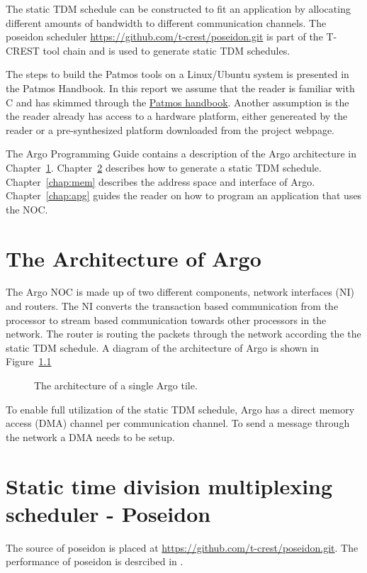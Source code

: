 \documentclass[a4paper,fontsize=10pt,twoside,DIV15,BCOR12mm,headinclude=true,footinclude=false,pagesize,bibtotoc]{scrbook}
\begin{document}
The static TDM schedule can be constructed to fit an application by allocating
different amounts of bandwidth to different communication channels.
The poseidon scheduler \url{https://github.com/t-crest/poseidon.git} is part of
the T-CREST tool chain and is used to generate static TDM schedules.

The steps to build the Patmos tools on a Linux/Ubuntu
system is presented in the Patmos Handbook.
In this report we assume that the reader is familiar with C and has skimmed
through the \href{http://patmos.compute.dtu.dk/patmos_handbook.pdf}{Patmos handbook}.
Another assumption is the the reader already has access to a hardware platform,
either genereated by the reader or a pre-synthesized platform downloaded from the project webpage.

The Argo Programming Guide contains a description of the Argo architecture in Chapter~\ref{chap:arch}.
Chapter~\ref{chap:poseidon} describes how to generate a static TDM schedule.
Chapter~\ref{chap:mem} describes the address space and interface of Argo.
Chapter~\ref{chap:apg} guides the reader on how to program an application that uses the NOC.



\chapter{The Architecture of Argo}
\label{chap:arch}

The Argo NOC is made up of two different components,
network interfaces (NI) and routers.
The NI converts the transaction based communication from the processor to
stream based communication towards other processors in the network.
The router is routing the packets through the network according the the static TDM schedule.
A diagram of the architecture of Argo is shown in Figure~\ref{fig:diag}

\begin{figure}
\centering
\caption{The architecture of a single Argo tile.}
\label{fig:diag}
\end{figure}

To enable full utilization of the static TDM schedule,
Argo has a direct memory access (DMA) channel per communication channel.
To send a message through the network a DMA needs to be setup.


\chapter{Static time division multiplexing scheduler - Poseidon}
\label{chap:poseidon}
The source of poseidon is placed at \url{https://github.com/t-crest/poseidon.git}.
The performance of poseidon is desrcibed in \cite{}.%
\end{document}
